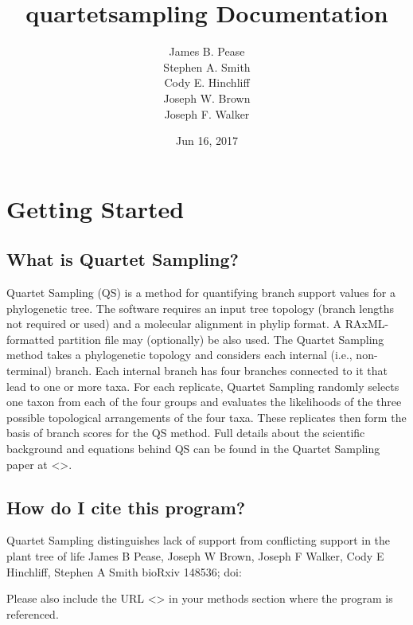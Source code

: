 \documentclass[letterpaper,12pt,english]{sphinxmanual}
\title{quartetsampling Documentation}
\date{Jun 16, 2017}
\author{James B. Pease \\ Stephen A. Smith \\ Cody E. Hinchliff \\Joseph W. Brown \\ Joseph F. Walker}
\begin{document}
\maketitle
\sphinxtableofcontents
{}\label{\detokenize{index::doc}}



\chapter{Getting Started}
\label{\detokenize{intro:intro}}\label{\detokenize{intro:getting-started}}\label{\detokenize{intro::doc}}\label{\detokenize{intro:manual-for-quartetsampling}}

\section{What is Quartet Sampling?}
\label{\detokenize{intro:what-is-quartet-sampling}}
Quartet Sampling (QS) is a method for quantifying branch support values for a phylogenetic tree.  The software requires an input tree topology (branch lengths not required or used) and a molecular alignment in phylip format.  A RAxML-formatted partition file may (optionally) be also used.  The Quartet Sampling method takes a phylogenetic topology and considers each internal (i.e., non-terminal) branch.  Each internal branch has four branches connected to it that lead to one or more taxa.  For each replicate, Quartet Sampling randomly selects one taxon from each of the four groups and evaluates the likelihoods of the three possible topological arrangements of the four taxa.  These replicates then form the basis of branch scores for the QS method.  Full details about the scientific background and equations behind QS can be found in the Quartet Sampling paper at \textless{}\textgreater{}.


\section{How do I cite this program?}
\label{\detokenize{intro:how-do-i-cite-this-program}}
Quartet Sampling distinguishes lack of support from conflicting support in the plant tree of life
James B Pease, Joseph W Brown, Joseph F Walker, Cody E Hinchliff, Stephen A Smith
bioRxiv 148536; doi: 

Please also include the URL \textless{}\textgreater{} in your methods section where the program is referenced.
\end{document}
